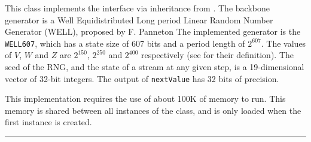 
This class implements the  interface via inheritance
from . The backbone generator is a Well 
Equidistributed Long period Linear Random Number Generator (WELL), 
proposed by F. Panneton 
The implemented generator is the \texttt{WELL607}, which has a state 
size of 607 bits
and a period length of  
\latex{$\rho\approx$} $2^{607}$. The values of $V$, $W$ and $Z$ are $2^{150}$,
$2^{250}$ and $2^{400}$ respectively (see  for their 
definition). The seed of the RNG, and the state of a stream at any given
step, is a 19-dimensional vector of 32-bit integers. 
The output of \texttt{nextValue} has 32 bits of precision.

This implementation requires the use of about
100K of memory to run. This memory is shared between all instances of the
class, and is only loaded when the first instance is created.


\bigskip\hrule

